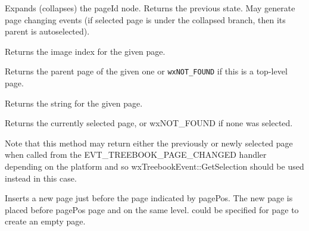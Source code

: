 Expands (collapses) the pageId node. Returns the previous state.
May generate page changing events (if selected page
is under the collapsed branch, then its parent is autoselected).


\label{wxtreebookgetpageimage}


Returns the image index for the given page.


\label{wxtreebookgetpageparent}


Returns the parent page of the given one or \texttt{wxNOT\_FOUND} if this is a
top-level page.


\label{wxtreebookgetpagetext}


Returns the string for the given page.



\label{wxtreebookgetselection}


Returns the currently selected page, or wxNOT\_FOUND if none was selected.

Note that this method may return either the previously or newly selected page
when called from the EVT\_TREEBOOK\_PAGE\_CHANGED handler
depending on the platform and so wxTreebookEvent::GetSelection should be used instead in this case.



\label{wxtreebookinsertpage}


Inserts a new page just before the page indicated by pagePos.
The new page is placed before pagePos page and on the same level.
\NULL could be specified for page to create an empty page.


\label{wxtreebookinsertsubpage}


